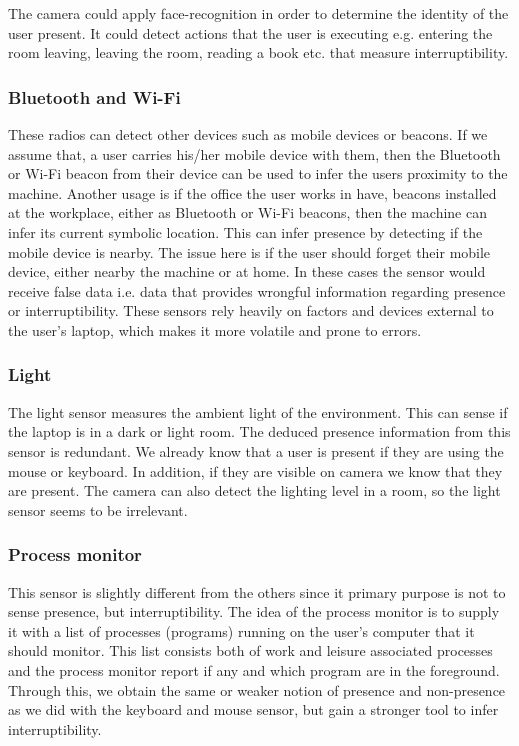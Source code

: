 \documentclass{sigchi}
\begin{document}
The camera could apply face-recognition in order to determine the identity of the user present.
It could detect actions that the user is executing e.g. entering the room leaving, leaving the room, reading a book etc. that measure interruptibility.

\subsubsection{Bluetooth and Wi-Fi}
These radios can detect other devices such as mobile devices or beacons.
If we assume that, a user carries his/her mobile device with them, then the Bluetooth or Wi-Fi beacon from their device can be used to infer the users proximity to the machine.
Another usage is if the office the user works in have, beacons installed at the workplace, either as Bluetooth or Wi-Fi beacons, then the machine can infer its current symbolic location.
This can infer presence by detecting if the mobile device is nearby.
The issue here is if the user should forget their mobile device, either nearby the machine or at home.
In these cases the sensor would receive false data i.e. data that provides wrongful information regarding presence or interruptibility.
These sensors rely heavily on factors and devices external to the user's laptop, which makes it more volatile and prone to errors.

\subsubsection{Light}
The light sensor measures the ambient light of the environment.
This can sense if the laptop is in a dark or light room.
The deduced presence information from this sensor is redundant.
We already know that a user is present if they are using the mouse or keyboard. In addition, if they are visible on camera we know that they are present.
The camera can also detect the lighting level in a room, so the light sensor seems to be irrelevant.

\subsubsection{Process monitor}
This sensor is slightly different from the others since it primary purpose is not to sense presence, but interruptibility.
The idea of the process monitor is to supply it with a list of processes (programs) running on the user's computer that it should monitor.
This list consists both of work and leisure associated processes and the process monitor report if any and which program are in the foreground. %
Through this, we obtain the same or weaker notion of presence and non-presence as we did with the keyboard and mouse sensor, but gain a stronger tool to infer interruptibility.
\end{document}
